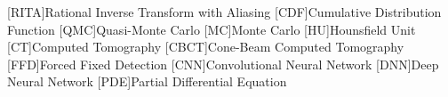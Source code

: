[RITA]{Rational Inverse Transform with Aliasing}
[CDF]{Cumulative Distribution Function}
[QMC]{Quasi-Monte Carlo}
[MC]{Monte Carlo}
[HU]{Hounsfield Unit}
[CT]{Computed Tomography}
[CBCT]{Cone-Beam Computed Tomography}
[FFD]{Forced Fixed Detection}
[CNN]{Convolutional Neural Network}
[DNN]{Deep Neural Network}
[PDE]{Partial Differential Equation}